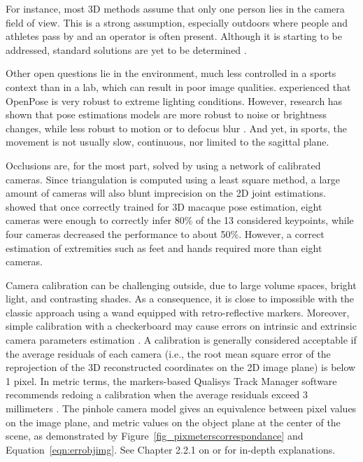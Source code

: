 For instance, most 3D methods assume that only one person lies in the camera field of view. This is a strong assumption, especially outdoors where people and athletes pass by and an operator is often present. Although it is starting to be addressed, standard solutions are yet to be determined \cite{Slembrouck2020,Bridgeman2019, Chu2021, Dong2019}. 

Other open questions lie in the environment, much less controlled in a sports context than in a lab, which can result in poor image qualities. \cite{Viswakumar2019} experienced that OpenPose is very robust to extreme lighting conditions. However, research has shown that pose estimations models are more robust to noise or brightness changes, while less robust to motion or to defocus blur \cite{Wang2021b}. And yet, in sports, the movement is not usually slow, continuous, nor limited to the sagittal plane.

Occlusions are, for the most part, solved by using a network of calibrated cameras. Since triangulation is computed using a least square method, a large amount of cameras will also blunt imprecision on the 2D joint estimations. \cite{Bala2020} showed that once correctly trained for 3D macaque pose estimation, eight cameras were enough to correctly infer 80\% of the 13 considered keypoints, while four cameras decreased the performance to about 50\%. However, a correct estimation of extremities such as feet and hands required more than eight cameras.

Camera calibration can be challenging outside, due to large volume spaces, bright light, and contrasting shades. As a consequence, it is close to impossible with the classic approach using a wand equipped with retro-reflective markers. Moreover, simple calibration with a checkerboard may cause errors on intrinsic and extrinsic camera parameters estimation \cite{Sun2005}. A calibration is generally considered acceptable if the average residuals of each camera (i.e., the root mean square error of the reprojection of the 3D reconstructed coordinates on the 2D image plane) is below 1 pixel. In metric terms, the markers-based Qualisys Track Manager software recommends redoing a calibration when the average residuals exceed 3 millimeters \cite{Qualisys2018}. The pinhole camera model gives an equivalence between pixel values on the image plane, and metric values on the object plane at the center of the scene, as demonstrated by Figure~\ref{fig_pixmeterscorrespondance} and Equation~\ref{eqn:errobjimg}. See Chapter 2.2.1 on  or \cite{Dawson-Howe1994} for in-depth explanations.

